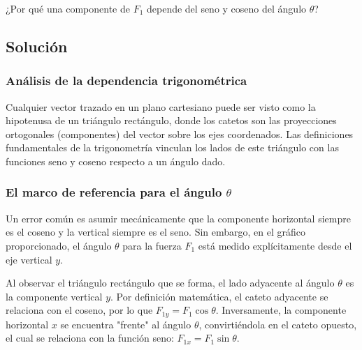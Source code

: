 \documentclass[12pt, a4paper]{article}
\begin{document}
\begin{center}
\end{center}

¿Por qué una componente de $F_1$ depende del seno y coseno del ángulo $\theta$?

\subsection*{Solución}

\subsubsection*{Análisis de la dependencia trigonométrica}
Cualquier vector trazado en un plano cartesiano puede ser visto como la hipotenusa de un triángulo rectángulo, donde los catetos son las proyecciones ortogonales (componentes) del vector sobre los ejes coordenados. Las definiciones fundamentales de la trigonometría vinculan los lados de este triángulo con las funciones seno y coseno respecto a un ángulo dado.

\subsubsection*{El marco de referencia para el ángulo $\theta$}
Un error común es asumir mecánicamente que la componente horizontal siempre es el coseno y la vertical siempre es el seno. Sin embargo, en el gráfico proporcionado, el ángulo $\theta$ para la fuerza $F_1$ está medido explícitamente desde el eje vertical $y$. 

Al observar el triángulo rectángulo que se forma, el lado adyacente al ángulo $\theta$ es la componente vertical $y$. Por definición matemática, el cateto adyacente se relaciona con el coseno, por lo que $F_{1y} = F_1 \cos\theta$. Inversamente, la componente horizontal $x$ se encuentra "frente" al ángulo $\theta$, convirtiéndola en el cateto opuesto, el cual se relaciona con la función seno: $F_{1x} = F_1 \sin\theta$.
\end{document}
